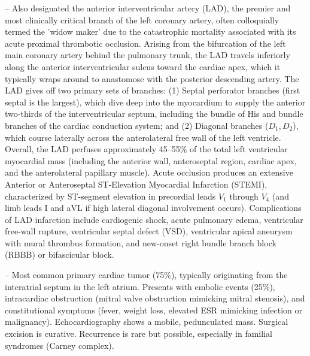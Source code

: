 -- Also designated the anterior interventricular artery (LAD), the premier and most clinically critical branch of the left coronary artery, often colloquially termed the 'widow maker' due to the catastrophic mortality associated with its acute proximal thrombotic occlusion. Arising from the bifurcation of the left main coronary artery behind the pulmonary trunk, the LAD travels inferiorly along the anterior interventricular sulcus toward the cardiac apex, which it typically wraps around to anastomose with the posterior descending artery. The LAD gives off two primary sets of branches: (1) Septal perforator branches (first septal is the largest), which dive deep into the myocardium to supply the anterior two-thirds of the interventricular septum, including the bundle of His and bundle branches of the cardiac conduction system; and (2) Diagonal branches ($D_1, D_2$), which course laterally across the anterolateral free wall of the left ventricle. Overall, the LAD perfuses approximately 45--55\% of the total left ventricular myocardial mass (including the anterior wall, anteroseptal region, cardiac apex, and the anterolateral papillary muscle). Acute occlusion produces an extensive Anterior or Anteroseptal ST-Elevation Myocardial Infarction (STEMI), characterized by ST-segment elevation in precordial leads $V_1$ through $V_4$ (and limb leads I and aVL if high lateral diagonal involvement occurs). Complications of LAD infarction include cardiogenic shock, acute pulmonary edema, ventricular free-wall rupture, ventricular septal defect (VSD), ventricular apical aneurysm with mural thrombus formation, and new-onset right bundle branch block (RBBB) or bifascicular block.

-- Most common primary cardiac tumor (75\%), typically originating from the interatrial septum in the left atrium. Presents with embolic events (25\%), intracardiac obstruction (mitral valve obstruction mimicking mitral stenosis), and constitutional symptoms (fever, weight loss, elevated ESR mimicking infection or malignancy). Echocardiography shows a mobile, pedunculated mass. Surgical excision is curative. Recurrence is rare but possible, especially in familial syndromes (Carney complex).


